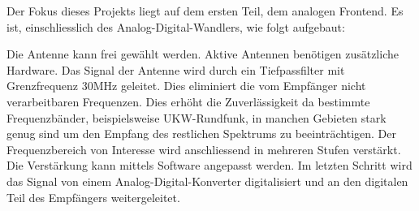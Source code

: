 Der Fokus dieses Projekts liegt auf dem ersten Teil, dem analogen Frontend. Es ist, einschliesslich des Analog-Digital-Wandlers, wie folgt aufgebaut:


Die Antenne kann frei gewählt werden. Aktive Antennen benötigen zusätzliche Hardware. Das Signal der Antenne wird durch ein Tiefpassfilter mit Grenzfrequenz 30MHz geleitet. Dies eliminiert die vom Empfänger nicht verarbeitbaren Frequenzen. Dies erhöht die Zuverlässigkeit da bestimmte Frequenzbänder, beispielsweise UKW-Rundfunk, in manchen Gebieten stark genug sind um den Empfang des restlichen Spektrums zu beeinträchtigen.
Der Frequenzbereich von Interesse wird anschliessend in mehreren Stufen verstärkt. Die Verstärkung kann mittels Software angepasst werden. Im letzten Schritt wird das Signal von einem Analog-Digital-Konverter digitalisiert und an den digitalen Teil des Empfängers weitergeleitet.